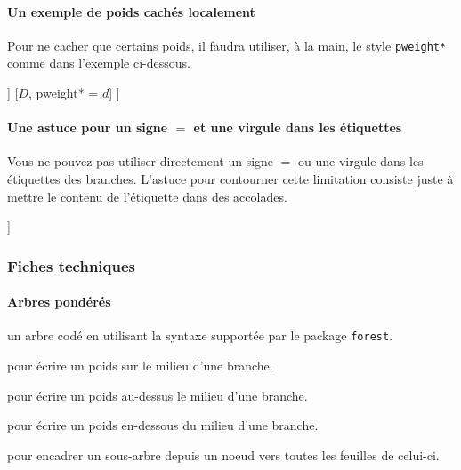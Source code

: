 \documentclass[12pt,a4paper]{article}
\begin{document}


\paragraph{Un exemple de poids cachés localement}

Pour ne cacher que certains poids, il faudra utiliser, à la main, le style \verb+pweight*+ comme dans l'exemple ci-dessous.

\begin{latexex}
\begin{probatree}
[
    [$A$, pweight = $a$
        [$B$, pweight* = $b$]
        [$C$, pweight = $c$]
    ]
    [$D$, pweight* = $d$]
]
\end{probatree}
\end{latexex}




\paragraph{Une astuce pour un signe $=$ et une virgule dans les étiquettes}

Vous ne pouvez pas utiliser directement un signe $=$ ou une virgule dans les étiquettes des branches. L'astuce pour contourner cette limitation consiste juste à mettre le contenu de l'étiquette dans des accolades.

\begin{latexex}
\begin{probatree}
[
    [$A$, apweight = {$a = 0,1$}]
    [$B$, bpweight = $b$]
]
\end{probatree}
\end{latexex}




\subsubsection{Fiches techniques}

\paragraph{Arbres pondérés}



\Content{} un arbre codé en utilisant la syntaxe supportée par le package \verb+forest+.

 pour écrire un poids sur le milieu d'une branche.

 pour écrire un poids au-dessus le milieu d'une branche.

 pour écrire un poids en-dessous du milieu d'une branche.

 pour encadrer un sous-arbre depuis un noeud vers toutes les feuilles de celui-ci.
\end{document}
